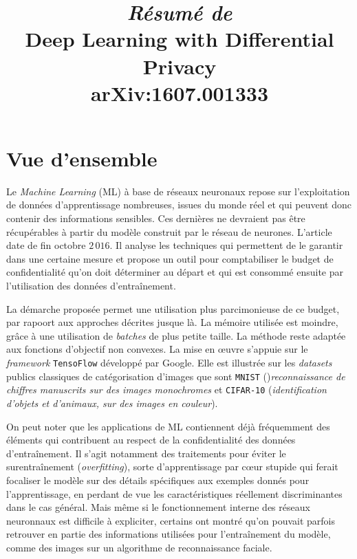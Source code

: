 \documentclass[a4paper,11pt]{article} %
\title{\emph{Résumé de}\\\textbf{Deep Learning with Differential Privacy}\\\small{arXiv:1607.001333}}
\date{}
\newcommand{\ttt}[1]{\texttt{#1}}
\begin{document}
\maketitle


\section{Vue d'ensemble}
Le \emph{Machine Learning} (ML) à base de réseaux neuronaux repose sur l'exploitation de données d'apprentissage nombreuses, issues du monde réel et qui peuvent donc contenir des informations sensibles. Ces dernières ne devraient pas être récupérables à partir du modèle construit par le réseau de neurones. L'article date de fin octobre $2\,016$. Il analyse les techniques qui permettent de le garantir dans une certaine mesure et propose un outil pour comptabiliser le \og budget de confidentialité\fg{} qu'on doit déterminer au départ et qui est consommé ensuite par l'utilisation des données d'entraînement.

La démarche proposée permet une utilisation plus parcimonieuse de ce budget, par rapoort aux approches décrites jusque là. La mémoire utilisée est moindre, grâce à une utilisation de \emph{batches} de plus petite taille. La méthode reste adaptée aux fonctions d'objectif non convexes. La mise en œuvre s'appuie sur le \emph{framework} \ttt{TensoFlow} développé par Google. Elle est illustrée sur les \emph{datasets} publics classiques de catégorisation d'images que sont \ttt{MNIST} ()\emph{reconnaissance de chiffres manuscrits sur des images monochromes} et \ttt{CIFAR-10} (\emph{identification d'objets et d'animaux, sur des images en couleur}).

On peut noter que les applications de ML contiennent déjà fréquemment des éléments qui contribuent au respect de la confidentialité des données d'entraînement. Il s'agit notamment des traitements pour éviter le surentraînement (\emph{overfitting}), sorte d'apprentissage par cœur stupide qui ferait focaliser le modèle sur des détails spécifiques aux exemples donnés pour l'apprentissage, en perdant de vue les caractéristiques réellement discriminantes dans le cas général. Mais même si le fonctionnement interne des réseaux neuronnaux est difficile à expliciter, certains ont montré qu'on pouvait parfois retrouver en partie des informations utilisées pour l'entraînement du modèle, comme des images sur un algorithme de reconnaissance faciale.
\end{document}

